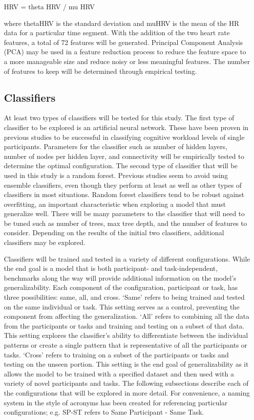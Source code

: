 \documentclass[11pt]{artikel3}
\begin{document}
	HRV = theta HRV / mu HRV

where thetaHRV is the standard deviation and muHRV is the mean of the HR data for a particular time segment. With the addition of the two heart rate features, a total of 72 features will be generated. Principal Component Analysis (PCA) may be used in a feature reduction process to reduce the feature space to a more manageable size and reduce noisy or less meaningful features. The number of features to keep will be determined through empirical testing.

\subsection{Classifiers}
At least two types of classifiers will be tested for this study.  The first type of classifier to be explored is an artificial neural network. These have been proven in previous studies \cite{Wilson} to be successful in classifying cognitive workload levels of single participants. Parameters for the classifier such as number of hidden layers, number of nodes per hidden layer, and connectivity will be empirically tested to determine the optimal configuration. The second type of classifier that will be used in this study is a random forest. Previous studies seem to avoid using ensemble classifiers, even though they perform at least as well as other types of classifiers in most situations. Random forest classifiers tend to be robust against overfitting, an important characteristic when exploring a model that must generalize well. There will be many parameters to the classifier that will need to be tuned such as number of trees, max tree depth, and the number of features to consider. Depending on the results of the initial two classifiers, additional classifiers may be explored.  

Classifiers will be trained and tested in a variety of different configurations. While the end goal is a model that is both participant- and task-independent, benchmarks along the way will provide additional information on the model’s generalizability. Each component of the configuration, participant or task, has three possibilities: same, all, and cross. ‘Same’ refers to being trained and tested on the same individual or task. This setting serves as a control, preventing the component from affecting the generalization. ‘All’ refers to combining all the data from the participants or tasks and training and testing on a subset of that data. This setting explores the classifier’s ability to differentiate between the individual patterns or create a single pattern that is representative of all the participants or tasks. ‘Cross’ refers to training on a subset of the participants or tasks and testing on the unseen portion. This setting is the end goal of generalizability as it allows the model to be trained with a specified dataset and then used with a variety of novel participants and tasks. The following subsections describe each of the configurations that will be explored in more detail. For convenience, a naming system in the style of acronyms has been created for referencing particular configurations; e.g. SP-ST refers to Same Participant - Same Task. 
\end{document}
